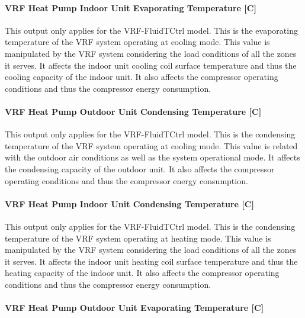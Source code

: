\paragraph{VRF Heat Pump Indoor Unit Evaporating Temperature {[}C{]}}\label{vrf-heat-pump-indoor-unit-evaporating-temperature-at-cooling-mode-c}

This output only applies for the VRF-FluidTCtrl model. This is the evaporating temperature of the VRF system operating at cooling mode. This value is manipulated by the VRF system considering the load conditions of all the zones it serves. It affects the indoor unit cooling coil surface temperature and thus the cooling capacity of the indoor unit. It also affects the compressor operating conditions and thus the compressor energy consumption.

\paragraph{VRF Heat Pump Outdoor Unit Condensing Temperature {[}C{]}}\label{vrf-heat-pump-outdoor-unit-condensing-temperature-at-cooling-mode-c}

This output only applies for the VRF-FluidTCtrl model. This is the condensing temperature of the VRF system operating at cooling mode. This value is related with the outdoor air conditions as well as the system operational mode. It affects the condensing capacity of the outdoor unit. It also affects the compressor operating conditions and thus the compressor energy consumption.

\paragraph{VRF Heat Pump Indoor Unit Condensing Temperature {[}C{]}}\label{vrf-heat-pump-indoor-unit-condensing-temperature-at-heating-mode-c}

This output only applies for the VRF-FluidTCtrl model. This is the condensing temperature of the VRF system operating at heating mode. This value is manipulated by the VRF system considering the load conditions of all the zones it serves. It affects the indoor unit heating coil surface temperature and thus the heating capacity of the indoor unit. It also affects the compressor operating conditions and thus the compressor energy consumption.

\paragraph{VRF Heat Pump Outdoor Unit Evaporating Temperature {[}C{]}}\label{vrf-heat-pump-outdoor-unit-evaporating-temperature-at-heating-mode-c}

